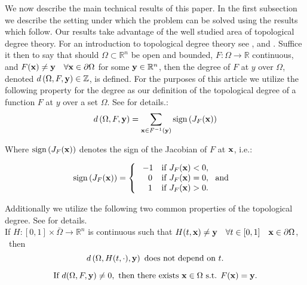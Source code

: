 We now describe the main technical results of this paper. 
In the first subsection we describe the setting under which the problem can be solved using the results which follow. Our results take advantage of the well studied area of topological degree theory. 
For an introduction to topological degree theory see \cite{OrChCh2006}, \cite{fonseca1995degree} and \cite{MoVrYa2002}. 
Suffice it then to say that should $\Omega\subset\mathbb{R}^{n}$ be open and bounded, $F:\Omega\rightarrow \mathbb{R}$ continuous, and $F(\bold x)\neq \bold y \quad \forall \bold x\in\partial\Omega$ for some $\bold y\in\mathbb{R}^n$, then the degree of $F$ at $y$ over $\Omega$, denoted $d\left(\Omega,F,\bold y\right)\in\mathbb{Z}$, is defined. 
For the purposes of this article we utilize the following property for the degree as our definition of the topological degree of a function $F$ at $y$ over a set $\Omega$. 
See \cite{OrChCh2006} for details.:
\begin{equation}\label{eq:Deg3}
d\left(\Omega,F,\bold y\right)=\sum\limits_{\bold x\in F^{-1}(\bold y)}\operatorname{sign}\left(J_F(\bold x)\right)
\end{equation}

Where $\operatorname{sign}\left(J_F(\bold x)\right)$ denotes the sign of the Jacobian of $F$ at $\bold x$, i.e.:

\[\operatorname{sign}\left(J_F(\bold x)\right)=   \left\{
\begin{array}{ll}
       \ -1   & \mbox{if } J_F(\bold x)< 0, \\
      \quad 0 & \mbox{if } J_F(\bold x)= 0,~\mbox{ and } \\
      \quad 1 & \mbox{if } J_F(\bold x)> 0. \\
\end{array} 
\right. \]

Additionally we utilize the following two common properties of the topological degree. 
See \cite{OrChCh2006} for details. \\
If $H : [0,1]\times\bar{\Omega}\rightarrow\mathbb{R}^n$ is continuous such that $H(t,\bold x)\neq \bold y \quad \forall t\in[0,1]\quad \bold x\in\partial\Omega$,   \ then 
\begin{equation}\label{eq:Deg1} 
d\left(\Omega,H(t,\cdot),\bold y\right)\text{ does not depend on }t.
\end{equation}

\begin{equation}\label{eq:Deg2}
\text{If }d(\Omega,F,\bold y)\neq 0,\text{ then there exists }\bold x\in\Omega\text{ s.t. }F(\bold x)=\bold y. 
\end{equation}



